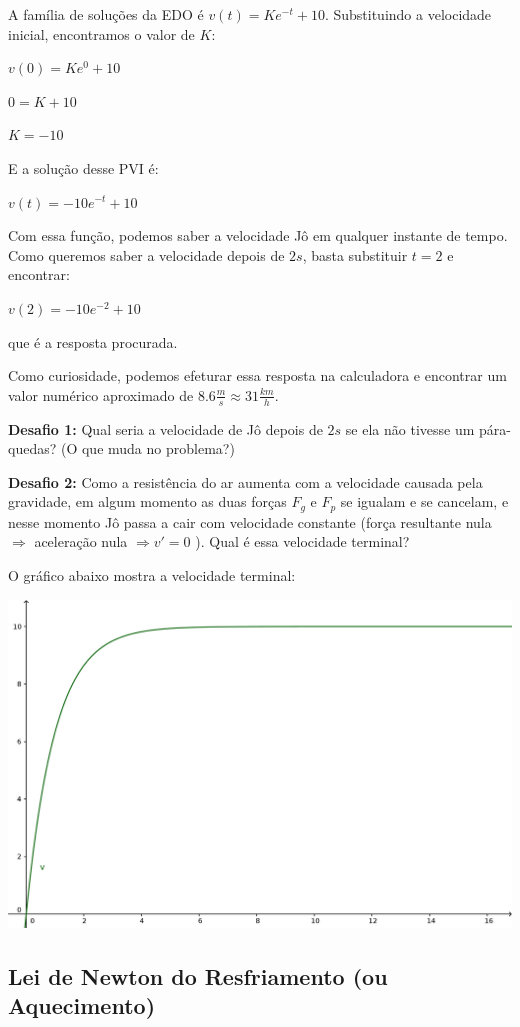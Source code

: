 \documentclass[a4paper]{article}
\begin{document}
A família de soluções da EDO é $v(t)=K e^{-t}+10$. Substituindo a
velocidade inicial, encontramos o valor de $K$:

$v(0) = K e^0 +10$

$0 = K+10$

$K=-10$

E a solução desse PVI é:

$v(t) = -10e^{-t}+10$

Com essa função, podemos saber a velocidade Jô em qualquer instante de
tempo. Como queremos saber a velocidade depois de $2s$, basta
substituir $t=2$ e encontrar:

$v(2)=-10 e^{-2}+10$

que é a resposta procurada.

Como curiosidade, podemos efeturar essa resposta na calculadora e
encontrar um valor numérico aproximado de
$8.6\frac{m}{s} \approx 31\frac{km}{h}$.

\hrulefill

{\bf Desafio 1:} Qual seria a velocidade de Jô depois de $2s$ se ela
não tivesse um pára-quedas? (O que muda no problema?)

\hrulefill

{\bf Desafio 2:} Como a resistência do ar aumenta com a velocidade
causada pela gravidade, em algum momento as duas forças $F_g$ e $F_p$
se igualam e se cancelam, e nesse momento Jô passa a cair com
velocidade constante (força resultante nula $\Rightarrow$ aceleração
nula $\Rightarrow v'=0$ ). Qual é essa velocidade terminal?

O gráfico abaixo mostra a velocidade terminal:

\begin{center}
  \includegraphics[width=.65\textwidth]{pqd}
\end{center}

\subsection{Lei de Newton do Resfriamento (ou Aquecimento)}
\end{document}
